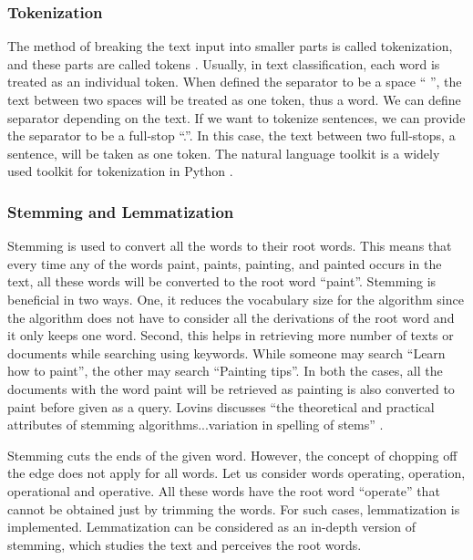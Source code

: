 \documentclass[12pt]{article}
\begin{document}
\subsubsection{Tokenization} 
The method of breaking the text input into smaller parts is called tokenization, and these parts are called tokens \parencites[57]{manning2014stanford}. Usually, in text classification, each word is treated as an individual token. When defined the separator to be a space `` '', the text between two spaces will be treated as one token, thus a word. We can define separator depending on the text. If we want to tokenize sentences, we can provide the separator to be a full-stop ``.''. In this case, the text between two full-stops, a sentence, will be taken as one token. The natural language toolkit is a widely used toolkit for tokenization in Python \parencites{bird2004nltk}.

\subsubsection{Stemming and Lemmatization} 
Stemming is used to convert all the words to their root words. This means that every time any of the words paint, paints, painting, and painted occurs in the text, all these words will be converted to the root word ``paint''. Stemming is beneficial in two ways. One, it reduces the vocabulary size for the algorithm since the algorithm does not have to consider all the derivations of the root word and it only keeps one word. Second, this helps in retrieving more number of texts or documents while searching using keywords. While someone may search ``Learn how to paint'', the other may search ``Painting tips''. In both the cases, all the documents with the word paint will be retrieved as painting is also converted to paint before given as a query. Lovins discusses ``the theoretical and practical attributes of stemming algorithms...variation in spelling of stems'' \parencites[22]{lovins1968development}.

Stemming cuts the ends of the given word. However, the concept of chopping off the edge does not apply for all words. Let us consider words operating, operation, operational and operative. All these words have the root word ``operate'' that cannot be obtained just by trimming the words. For such cases, lemmatization is implemented. Lemmatization can be considered as an in-depth version of stemming, which studies the text and perceives the root words.
\end{document}
